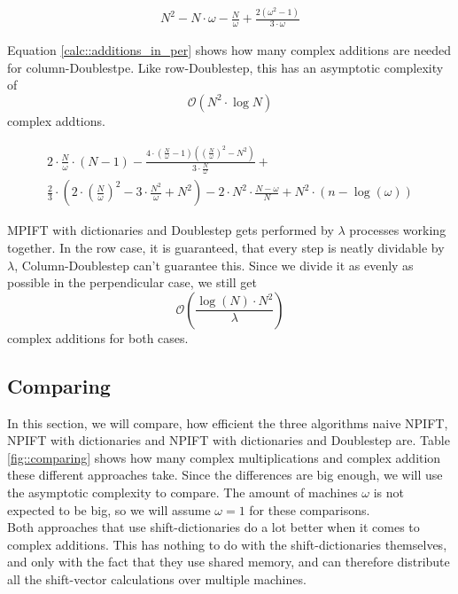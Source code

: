 \documentclass[12pt]{article}
\begin{document}
\begin{equation}
\begin{split} 
N^2-N\cdot \omega-\frac{N}{\omega}+\frac{2(\omega^2-1)}{3\cdot \omega}
\end{split}
\label{calc::valuesShiftDicPerpendicular}
\end{equation}

Equation \eqref{calc::additions_in_per} shows how many complex additions are needed for column-Doublestpe. Like row-Doublestep, this has an asymptotic complexity of \[
\mathcal{O}(N^2\cdot \log{N})
\] complex addtions.




\begin{equation}
\begin{split} 
2\cdot \frac{N}{\omega}\cdot (N-1) - \frac{4\cdot (\frac{N}{\omega}-1)((\frac{N}{\omega})^2-N^2)}{3\cdot \frac{N}{\omega}} +\\
 \frac{2}{3}\cdot (2\cdot {(\frac{N}{\omega})}^2-3\cdot \frac{N^2}{\omega}+N^2) -2\cdot N^2\cdot \frac{N-\omega}{N}+N^2\cdot (n-\log(\omega))
 \end{split}
 \label{calc::additions_in_per}
\end{equation}

MPIFT with dictionaries and Doublestep gets performed by $\lambda$ processes working together. In the row case, it is guaranteed, that every step is neatly dividable by $\lambda$, Column-Doublestep can't guarantee this. Since we divide it as evenly as possible in the perpendicular case, we still get  
\[
\mathcal{O}(\frac{ \log{(N)}\cdot N^2}{\lambda})
\] complex additions for both cases. 


\subsection{Comparing}
\label{sec::Comparing}
In this section, we will compare, how efficient the three algorithms naive NPIFT, NPIFT with dictionaries and NPIFT with dictionaries and Doublestep are. Table \ref{fig::comparing} shows how many complex multiplications and complex addition these different approaches take. Since the differences are big enough, we will use the asymptotic complexity to compare. The amount of machines $\omega$ is not expected to be big, so we will assume $\omega=1$ for these comparisons. \\

Both approaches that use shift-dictionaries do a lot better when it comes to complex additions. This has nothing to do with the shift-dictionaries themselves, and only with the fact that they use shared memory, and can therefore distribute all the shift-vector calculations over multiple machines.
\end{document}
